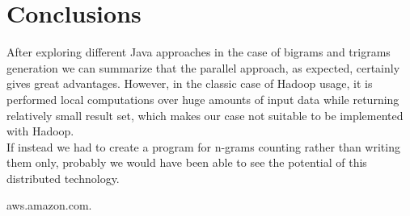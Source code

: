 \documentclass[10pt,twocolumn,letterpaper]{article}
\begin{document}
\section{Conclusions}
After exploring different Java approaches in the case of bigrams and trigrams generation we can summarize that the parallel approach, as expected, certainly gives great advantages.
However, in the classic case of Hadoop usage, it is performed local computations over huge amounts of input data while returning relatively small result set, which makes our case  not  suitable to be implemented with Hadoop.\\
If instead we had to create a program for n-grams counting rather than writing them only, probably we would have been able to see the potential of this distributed technology.



{\small


aws.amazon.com.
}
\end{document}
